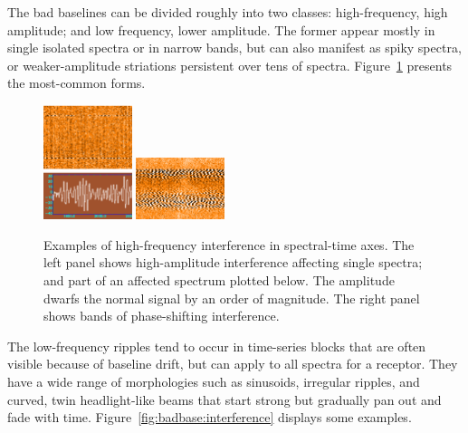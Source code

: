 \documentclass[final,authoryear,5p,times,twocolumn]{elsarticle}
\begin{document}
The bad baselines can be divided roughly into two classes:
high-frequency, high amplitude; and low frequency, lower
amplitude. The former appear mostly in single isolated spectra or in
narrow bands, but can also manifest as spiky spectra, or
weaker-amplitude striations persistent over tens of spectra.
Figure~\ref{fig:badbase:highfreq} presents the most-common forms.

\begin{figure}[!ht]
\includegraphics[width=0.23\textwidth]{P61_f1a}
\includegraphics[width=0.23\textwidth]{P61_f1b}
\caption{Examples of high-frequency interference in spectral-time
  axes. The left panel shows high-amplitude interference affecting
  single spectra; and part of an affected spectrum plotted below. The
  amplitude dwarfs the normal signal by an order of magnitude. The
  right panel shows bands of phase-shifting interference.}
\label{fig:badbase:highfreq}
\end{figure}

The low-frequency ripples tend to occur in time-series blocks that are
often visible because of baseline drift, but can apply to all spectra
for a receptor. They have a wide range of morphologies such as
sinusoids, irregular ripples, and curved, twin headlight-like beams
that start strong but gradually pan out and fade with time.
Figure~\ref{fig:badbase:interference} displays some examples.
\end{document}
